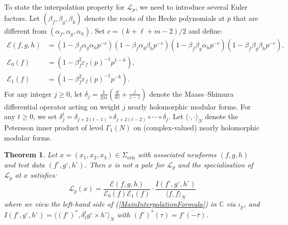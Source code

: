 \documentclass[10pt, oneside]{amsart}
\numberwithin{equation}{subsection}
\newtheorem{theorem}[equation]{Theorem}
\theoremstyle{definition}
\theoremstyle{remark}
\newcommand{\mbb}[1]{\mathbb{#1}}
\newcommand{\opn}[1]{\operatorname{#1}}
\begin{document}
To state the interpolation property for $\mathscr{L}_p$, we need to introduce several Euler factors. Let $(\beta_f, \beta_g, \beta_h)$ denote the roots of the Hecke polynomials at $p$ that are different from $(\alpha_f, \alpha_g, \alpha_h)$. Set $c = (k+ \ell + m - 2)/2$ and define:
\begin{align*}
    \mathcal{E}(f, g, h) &= (1 - \beta_f \alpha_g \alpha_h p^{-c})(1 - \beta_f \alpha_g \beta_h p^{-c})(1 - \beta_f \beta_g \alpha_h p^{-c})(1 - \beta_f \beta_g \beta_h p^{-c}), \\
    \mathcal{E}_0(f) &= (1- \beta_f^2 \varepsilon_f(p)^{-1} p^{1-k}), \\
    \mathcal{E}_1(f) &= (1- \beta_f^2 \varepsilon_f(p)^{-1} p^{-k}).
\end{align*}
For any integer $j \geq 0$, let $\delta_j = \frac{1}{2 \pi i}\left(\frac{d}{dz} + \frac{j}{z - \bar{z}} \right)$ denote the Maass--Shimura differential operator acting on weight $j$ nearly holomorphic modular forms. For any $t \geq 0$, we set $\delta_j^t = \delta_{j+2(t-1)} \circ \delta_{j + 2(t-2)} \circ \cdots \circ \delta_j$. Let $\langle \cdot, \cdot \rangle_N$ denote the Petersson inner product of level $\Gamma_1(N)$ on (complex-valued) nearly holomorphic modular forms. 

\begin{theorem} \label{TripleProductJinterpolation}
Let $x = (x_1, x_2, x_3) \in \Sigma_{\opn{cris}}$ with associated newforms $(f, g, h)$ and test data $(f^{\circ}, g^{\circ}, h^{\circ})$. Then $x$ is not a pole for $\mathscr{L}_p$ and the specialisation of $\mathscr{L}_p$ at $x$ satisfies:
\begin{equation} \label{MainInterpolationFormula}
\mathscr{L}_p(x) = \frac{\mathcal{E}(f, g, h)}{\mathcal{E}_0(f)\mathcal{E}_1(f)} \cdot \frac{I(f^{\circ}, g^{\circ}, h^{\circ})}{\langle f, f \rangle_N }
\end{equation}
where we view the left-hand side of (\ref{MainInterpolationFormula}) in $\mbb{C}$ via $\iota_p$, and $I(f^{\circ}, g^{\circ}, h^{\circ}) = \langle (f^{\circ})^*, \delta_{\ell}^t g^{\circ} \times h^{\circ} \rangle_N$ with $(f^{\circ})^*(\tau) = \overline{f^{\circ}(-\bar{\tau})}$.
\end{theorem}
\end{document}
